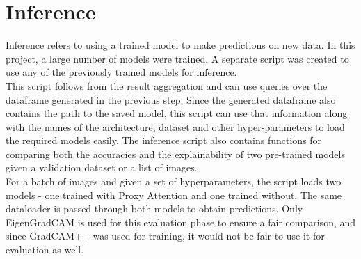 \section{Inference}
Inference refers to using a trained model to make predictions on new data. In this project, a large number of models were trained. A separate script was created to use any of the previously trained models for inference.\\
This script follows from the result aggregation and can use queries over the dataframe generated in the previous step. Since the generated dataframe also contains the path to the saved model, this script can use that information along with the names of the architecture, dataset and other hyper-parameters to load the required models easily.
The inference script also contains functions for comparing both the accuracies and the explainability of two pre-trained models given a validation dataset or a list of images.\\
For a batch of images and given a set of hyperparameters, the script loads two models - one trained with Proxy Attention and one trained without. The same dataloader is passed through both models to obtain predictions. Only EigenGradCAM is used for this evaluation phase to ensure a fair comparison, and since GradCAM++ was used for training, it would not be fair to use it for evaluation as well. 